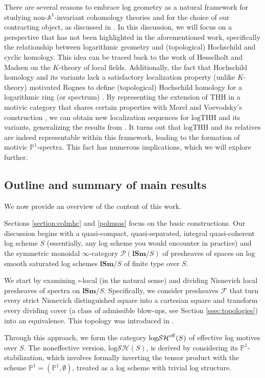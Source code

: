 \documentclass[11pt, a4paper]{amsart}
\theoremstyle{definition}
\numberwithin{equation}{subsection}
\newcommand{\lSm}{\mathbf{lSm}}
\newcommand{\THH}{\mathrm{THH}}
\newcommand{\logTHH}{\mathrm{logTHH}}
\newcommand{\boxx}{\square}
\newcommand{\eff}{{\rm eff}}
\newcommand{\inflogSH}{\mathrm{log}\mathcal{SH}}
\begin{document}
There are several reasons to embrace log geometry as a natural framework for studying non-\(\mathbb{A}^1\)-invariant cohomology theories and for the choice of our contracting object, as discussed in \cite{logDM}. In this discussion, we will focus on a perspective that has not been highlighted in the aforementioned work, specifically the relationship between logarithmic geometry and (topological) Hochschild and cyclic homology.
This idea can be traced back to the work of Hesselholt and Madsen on the \(K\)-theory of local fields. Additionally, the fact that Hochschild homology and its variants lack a satisfactory localization property (unlike \(K\)-theory) motivated Rognes to define (topological) Hochschild homology for a logarithmic ring (or spectrum) \cite{RognesLogHH}. By representing the extension of \(\THH\) in a motivic category that shares certain properties with Morel and Voevodsky's construction \cite{MV}, we can obtain new localization sequences for \(\logTHH\) and its variants, generalizing the results from \cite{RSS}.
It turns out that \(\logTHH\) and its relatives are indeed representable within this framework, leading to the formation of motivic \(\mathbb{P}^1\)-spectra. This fact has numerous implications, which we will explore further.



\subsection{Outline and summary of main results}
We now provide an overview of the content of this work. 

Sections \ref{section:colmhc} and \ref{polmsas} focus on the basic constructions. Our discussion begins with a quasi-compact, quasi-separated, integral quasi-coherent log scheme \( S \) (essentially, any log scheme you would encounter in practice) and the symmetric monoidal \(\infty\)-category \(\mathcal{P}(\lSm/S)\) of presheaves of spaces on log smooth saturated log schemes \(\lSm/S\) of finite type over \( S \).

We start by examining \(\boxx\)-local (in the natural sense) and dividing Nisnevich local presheaves of spectra on \(\lSm/S\). Specifically, we consider presheaves \(\mathcal{F}\) that turn every strict Nisnevich distinguished square into a cartesian square and transform every dividing cover (a class of admissible blow-ups, see Section \ref{ssec:topologies}) into an equivalence. This topology was introduced in \cite{logDM}.

Through this approach, we form the category \(\inflogSH^{\eff}(S)\) of effective log motives over \( S \). The noneffective version, \(\inflogSH(S)\), is derived by considering its \(\mathbb{P}^1\)-stabilization, which involves formally inverting the tensor product with the scheme \(\mathbb{P}^1 = (\mathbb{P}^1, \emptyset)\), treated as a log scheme with trivial log structure. 
\end{document}
